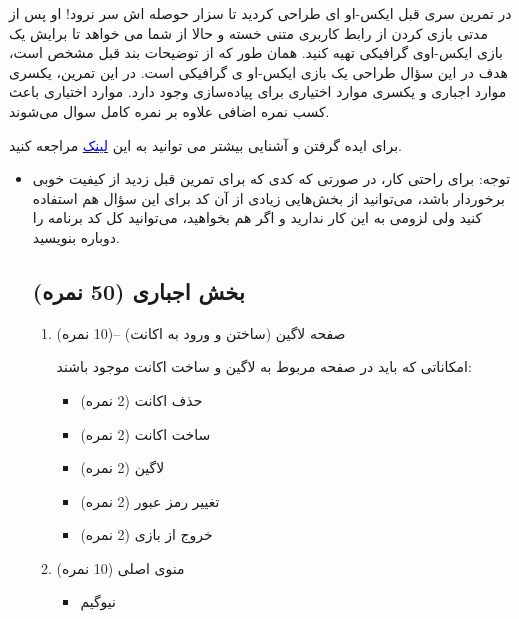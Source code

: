 \documentclass[]{article}
\begin{document}
در تمرین سری قبل ایکس-او ای طراحی کردید تا سزار حوصله اش سر نرود! او پس از مدتی بازی کردن از رابط کاربری متنی خسته و حالا از شما می خواهد تا برایش یک بازی ایکس-اوی گرافیکی تهیه کنید. 
همان طور که از توضیحات بند قبل مشخص است، هدف در این سؤال طراحی یک بازی ایکس-او ی گرافیکی است. در این تمرین، یکسری موارد اجباری و یکسری موارد اختیاری برای پیاده‌سازی وجود دارد. موارد اختیاری باعث کسب نمره اضافی علاوه بر نمره کامل سوال می‌شوند.


برای ایده گرفتن و آشنایی بیشتر می توانید به این \href{https://bejofo.net/ttt}{\textcolor{blue}{لینک}} مراجعه کنید. 





\begin{itemize}[label = {$\blacksquare$}]

\item
توجه: برای راحتی کار، در صورتی که کدی که برای تمرین قبل زدید از کیفیت خوبی برخوردار باشد، می‌توانید از بخش‌هایی زیادی از آن کد برای این سؤال هم استفاده کنید ولی لزومی به این کار ندارید و اگر هم بخواهید، می‌توانید کل کد برنامه را دوباره بنویسید.

\setcounter{secnumdepth}{1}

\newpage
\subsection{بخش اجباری (50 نمره)}
\begin{enumerate}


\item
صفحه لاگین (ساختن و ورود به اکانت) –(10 نمره) 

امکاناتی که باید در صفحه مربوط به لاگین و ساخت اکانت موجود باشند:
\begin{itemize}[label = $\circ$]
\item
حذف اکانت (2 نمره)

\item
ساخت اکانت (2 نمره)

\item
لاگین (2 نمره)

\item
تغییر رمز عبور (2 نمره)

\item
خروج از بازی (2 نمره)

\end{itemize}

\item
منوی اصلی (10 نمره)

\begin{itemize}[label = $\circ$]
\item
نیوگیم


\end{itemize}
\end{enumerate}
\end{itemize}
\end{document}
